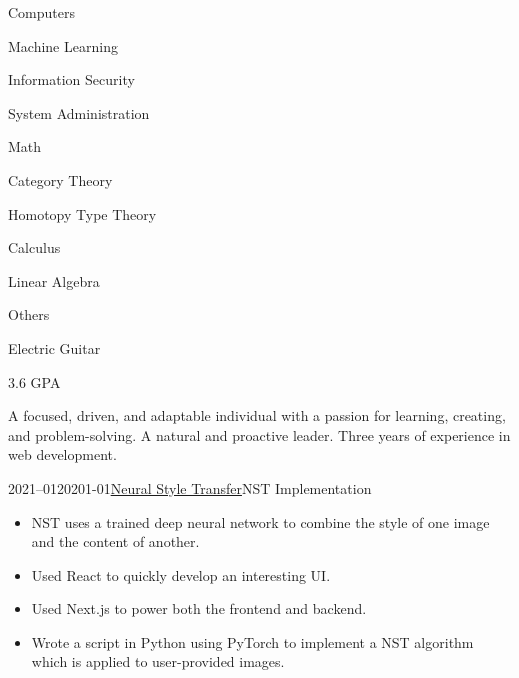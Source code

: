 \documentclass[10pt,a4paper,ragged2e,withhyper]{cvclass}
\begin{document}
\begin{paracol}{2}
\begin{mycolumn}[colback=Blue]
    \begin{cvskillsection}{Computers}{}
        \item Machine Learning
        \item Information Security
        \item System Administration
    \end{cvskillsection}

    \begin{cvskillsection}{Math}{}
        \item Category Theory
        \item Homotopy Type Theory
        \item Calculus
        \item Linear Algebra
    \end{cvskillsection}

    \begin{cvskillsection}{Others}{}
        \item Electric Guitar
    \end{cvskillsection}

    3.6 GPA

    \medskip

\end{mycolumn}

\switchcolumn

\begin{mycolumn}
    A focused, driven, and adaptable individual with a passion for learning, creating, and problem-solving. A natural and proactive leader. Three years of experience in web development.

    \begin{cvdateevent}{2021--01}{20201-01}{\href{http://ai.treywilkinson.com}{Neural Style Transfer}}{NST Implementation}
        \begin{itemize}
            \item NST uses a trained deep neural network to combine the style of one image and the content of another.
            \item Used React to quickly develop an interesting UI.
            \item Used Next.js to power both the frontend and backend.
            \item Wrote a script in Python using PyTorch to implement a NST algorithm which is applied to user-provided images.
        \end{itemize}
    \end{cvdateevent}
    \divider\\


\end{mycolumn}
\end{paracol}
\end{document}
